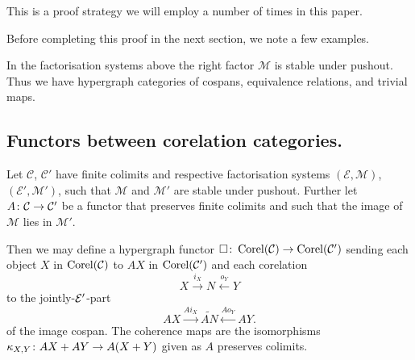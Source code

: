 This is a proof strategy we will employ a number of times in this paper.

Before completing this proof in the next section, we note a few examples.
\begin{examples}
  In the factorisation systems above the right factor $\mathcal M$ is stable
  under pushout.  Thus we have hypergraph categories of cospans, equivalence
  relations, and trivial maps.  
\end{examples}

\subsection{Functors between corelation categories.}

\begin{proposition} \label{prop.corelfunctors}
  Let $\mathcal C$, $\mathcal C'$ have finite colimits and respective
  factorisation systems $(\mathcal E, \mathcal M)$, $(\mathcal E', \mathcal M')$,
  such that $\mathcal M$ and $\mathcal M'$ are stable under pushout. Further let
  $A{\colon} \mathcal C \to \mathcal C'$ be a functor that preserves finite colimits
  and such that the image of $\mathcal M$ lies in $\mathcal M'$.

  Then we may define a hypergraph functor $\square{\colon} \operatorname{{Corel}}(\mathcal C) \to
  \operatorname{{Corel}}(\mathcal C')$ sending each object $X$ in $\operatorname{{Corel}}(\mathcal C)$ to $AX$ in
  $\operatorname{{Corel}}(\mathcal C')$ and each corelation 
  \[
    X \stackrel{i_X}{\longrightarrow} N \stackrel{o_Y}{\longleftarrow} Y 
  \]
  to the jointly-$\mathcal E'$-part
  \[
    AX \stackrel{Ai_X}{\longrightarrow} \widetilde{AN} \stackrel{Ao_Y}{\longleftarrow} AY.
  \]
  of the image cospan. The coherence maps are the isomorphisms
  $\kappa_{X,Y}{\colon} AX+AY \to A(X+Y)$ given as $A$ preserves colimits.
\end{proposition}

